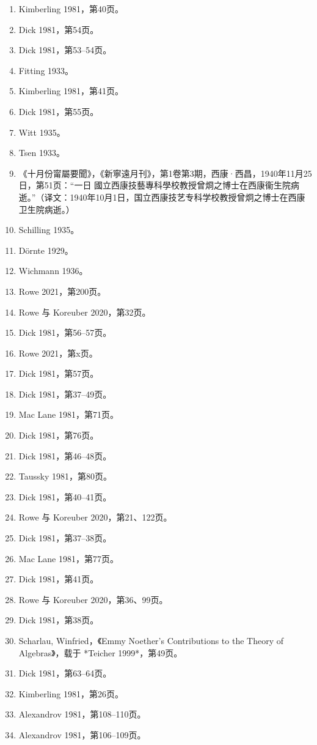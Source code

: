 \begin{enumerate}
\item Kimberling 1981，第40页。
\item Dick 1981，第54页。
\item Dick 1981，第53–54页。
\item Fitting 1933。
\item Kimberling 1981，第41页。
\item Dick 1981，第55页。
\item Witt 1935。
\item Tsen 1933。
\item 《十月份甯屬要聞》，《新寧遠月刊》，第1卷第3期，西康·西昌，1940年11月25日，第51页：“一日 國立西康技藝專科學校教授曾烱之博士在西康衞生院病逝。”（译文：1940年10月1日，国立西康技艺专科学校教授曾炯之博士在西康卫生院病逝。）
\item Schilling 1935。
\item Dörnte 1929。
\item Wichmann 1936。
\item Rowe 2021，第200页。
\item Rowe 与 Koreuber 2020，第32页。
\item Dick 1981，第56–57页。
\item Rowe 2021，第x页。
\item Dick 1981，第57页。
\item Dick 1981，第37–49页。
\item Mac Lane 1981，第71页。
\item Dick 1981，第76页。
\item Dick 1981，第46–48页。
\item Taussky 1981，第80页。
\item Dick 1981，第40–41页。
\item Rowe 与 Koreuber 2020，第21、122页。
\item Dick 1981，第37–38页。
\item Mac Lane 1981，第77页。
\item Dick 1981，第41页。
\item Rowe 与 Koreuber 2020，第36、99页。
\item Dick 1981，第38页。
\item Scharlau, Winfried，《Emmy Noether's Contributions to the Theory of Algebras》，载于 *Teicher 1999*，第49页。
\item Dick 1981，第63–64页。
\item Kimberling 1981，第26页。
\item Alexandrov 1981，第108–110页。
\item Alexandrov 1981，第106–109页。

\end{enumerate}
